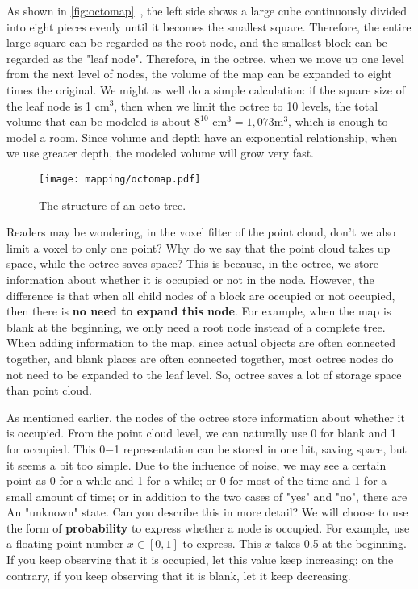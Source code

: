 As shown in \autoref{fig:octomap}~, the left side shows a large cube continuously divided into eight pieces evenly until it becomes the smallest square. Therefore, the entire large square can be regarded as the root node, and the smallest block can be regarded as the "leaf node". Therefore, in the octree, when we move up one level from the next level of nodes, the volume of the map can be expanded to eight times the original. We might as well do a simple calculation: if the square size of the leaf node is 1 cm$^3$, then when we limit the octree to 10 levels, the total volume that can be modeled is about $8^{10}\text{ cm}^3 = 1,073\text{m}^3$, which is enough to model a room. Since volume and depth have an exponential relationship, when we use greater depth, the modeled volume will grow very fast.

\begin{figure}[!ht]
	\centering
	\texttt{[image: mapping/octomap.pdf]}
	\caption{The structure of an octo-tree.}
	\label{fig:octomap}
\end{figure}

Readers may be wondering, in the voxel filter of the point cloud, don't we also limit a voxel to only one point? Why do we say that the point cloud takes up space, while the octree saves space? This is because, in the octree, we store information about whether it is occupied or not in the node. However, the difference is that when all child nodes of a block are occupied or not occupied, then there is \textbf{no need to expand this node}. For example, when the map is blank at the beginning, we only need a root node instead of a complete tree. When adding information to the map, since actual objects are often connected together, and blank places are often connected together, most octree nodes do not need to be expanded to the leaf level. So, octree saves a lot of storage space than point cloud.

As mentioned earlier, the nodes of the octree store information about whether it is occupied. From the point cloud level, we can naturally use 0 for blank and 1 for occupied. This 0−1 representation can be stored in one bit, saving space, but it seems a bit too simple. Due to the influence of noise, we may see a certain point as 0 for a while and 1 for a while; or 0 for most of the time and 1 for a small amount of time; or in addition to the two cases of "yes" and "no", there are An "unknown" state. Can you describe this in more detail? We will choose to use the form of \textbf{probability} to express whether a node is occupied. For example, use a floating point number $x \in [0,1]$ to express. This $x$ takes 0.5 at the beginning. If you keep observing that it is occupied, let this value keep increasing; on the contrary, if you keep observing that it is blank, let it keep decreasing.

